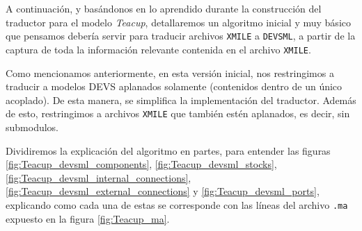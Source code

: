 A continuación, y basándonos en lo aprendido durante la construcción del traductor para el modelo \textit{Teacup}, detallaremos un algoritmo inicial y muy básico que pensamos debería servir para traducir archivos \texttt{XMILE} a \texttt{DEVSML}, a partir de la captura de toda la información relevante contenida en el archivo \texttt{XMILE}.

Como mencionamos anteriormente, en esta versión inicial, nos restringimos a traducir a modelos DEVS aplanados solamente (contenidos dentro de un único acoplado). De esta manera, se simplifica la implementación del traductor. Además de esto, restringimos a archivos \texttt{XMILE} que también estén aplanados, es decir, sin submodulos.

Dividiremos la explicación del algoritmo en partes, para entender las figuras \ref{fig:Teacup_devsml_components}, \ref{fig:Teacup_devsml_stocks}, \ref{fig:Teacup_devsml_internal_connections}, \ref{fig:Teacup_devsml_external_connections} y \ref{fig:Teacup_devsml_ports}, explicando como cada una de estas se corresponde con las líneas del archivo \texttt{.ma} expuesto en la figura \ref{fig:Teacup_ma}.


